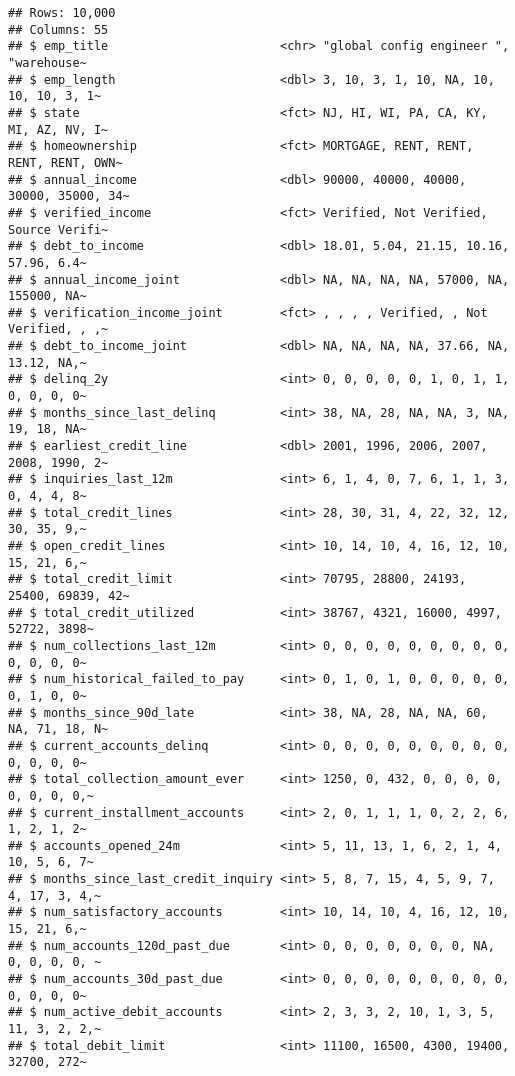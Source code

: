 \documentclass[
]{article}
\begin{document}
\begin{verbatim}
## Rows: 10,000
## Columns: 55
## $ emp_title                        <chr> "global config engineer ", "warehouse~
## $ emp_length                       <dbl> 3, 10, 3, 1, 10, NA, 10, 10, 10, 3, 1~
## $ state                            <fct> NJ, HI, WI, PA, CA, KY, MI, AZ, NV, I~
## $ homeownership                    <fct> MORTGAGE, RENT, RENT, RENT, RENT, OWN~
## $ annual_income                    <dbl> 90000, 40000, 40000, 30000, 35000, 34~
## $ verified_income                  <fct> Verified, Not Verified, Source Verifi~
## $ debt_to_income                   <dbl> 18.01, 5.04, 21.15, 10.16, 57.96, 6.4~
## $ annual_income_joint              <dbl> NA, NA, NA, NA, 57000, NA, 155000, NA~
## $ verification_income_joint        <fct> , , , , Verified, , Not Verified, , ,~
## $ debt_to_income_joint             <dbl> NA, NA, NA, NA, 37.66, NA, 13.12, NA,~
## $ delinq_2y                        <int> 0, 0, 0, 0, 0, 1, 0, 1, 1, 0, 0, 0, 0~
## $ months_since_last_delinq         <int> 38, NA, 28, NA, NA, 3, NA, 19, 18, NA~
## $ earliest_credit_line             <dbl> 2001, 1996, 2006, 2007, 2008, 1990, 2~
## $ inquiries_last_12m               <int> 6, 1, 4, 0, 7, 6, 1, 1, 3, 0, 4, 4, 8~
## $ total_credit_lines               <int> 28, 30, 31, 4, 22, 32, 12, 30, 35, 9,~
## $ open_credit_lines                <int> 10, 14, 10, 4, 16, 12, 10, 15, 21, 6,~
## $ total_credit_limit               <int> 70795, 28800, 24193, 25400, 69839, 42~
## $ total_credit_utilized            <int> 38767, 4321, 16000, 4997, 52722, 3898~
## $ num_collections_last_12m         <int> 0, 0, 0, 0, 0, 0, 0, 0, 0, 0, 0, 0, 0~
## $ num_historical_failed_to_pay     <int> 0, 1, 0, 1, 0, 0, 0, 0, 0, 0, 1, 0, 0~
## $ months_since_90d_late            <int> 38, NA, 28, NA, NA, 60, NA, 71, 18, N~
## $ current_accounts_delinq          <int> 0, 0, 0, 0, 0, 0, 0, 0, 0, 0, 0, 0, 0~
## $ total_collection_amount_ever     <int> 1250, 0, 432, 0, 0, 0, 0, 0, 0, 0, 0,~
## $ current_installment_accounts     <int> 2, 0, 1, 1, 1, 0, 2, 2, 6, 1, 2, 1, 2~
## $ accounts_opened_24m              <int> 5, 11, 13, 1, 6, 2, 1, 4, 10, 5, 6, 7~
## $ months_since_last_credit_inquiry <int> 5, 8, 7, 15, 4, 5, 9, 7, 4, 17, 3, 4,~
## $ num_satisfactory_accounts        <int> 10, 14, 10, 4, 16, 12, 10, 15, 21, 6,~
## $ num_accounts_120d_past_due       <int> 0, 0, 0, 0, 0, 0, 0, NA, 0, 0, 0, 0, ~
## $ num_accounts_30d_past_due        <int> 0, 0, 0, 0, 0, 0, 0, 0, 0, 0, 0, 0, 0~
## $ num_active_debit_accounts        <int> 2, 3, 3, 2, 10, 1, 3, 5, 11, 3, 2, 2,~
## $ total_debit_limit                <int> 11100, 16500, 4300, 19400, 32700, 272~

\end{verbatim}
\end{document}
